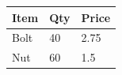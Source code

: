 \documentclass[11pt,a4paper]{article}
\begin{document}
\begin{table}[h]
\begin{tabular}{|l|l|l|}
\hline
Item & Qty & Price \\ \hline
Bolt & 40 & 2.75 \\ \hline
Nut & 60 & 1.5 \\ \hline
\end{tabular}
\end{table}
\end{document}
